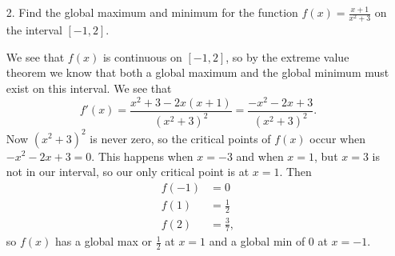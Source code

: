 \documentclass[11pt]{article}
\begin{document}
\newsavebox{\quizback}
\begin{lrbox}{\quizback}
\begin{minipage}[top][4.5in][t]{\textwidth} \setlength{\parindent}{1.5em}
\begin{enumerate}
\item[2.] Find the global maximum and minimum for the function
  $f(x)=\frac{x+1}{x^2+3}$ on the interval $[-1,2]$.


  \vfill
  {\color{blue}

    We see that $f(x)$ is continuous on $[-1,2]$, so by the extreme
    value theorem we know that both a global maximum and the global
    minimum must exist on this interval.  We see that
    \[
    f'(x)=\frac{x^2+3-2x(x+1)}{(x^2+3)^2} = \frac{-x^2-2x+3}{(x^2+3)^2}.
    \]
    Now $(x^2+3)^2$ is never zero, so the critical points of $f(x)$
    occur when $-x^2-2x+3=0$. This happens when $x=-3$ and when $x=1$,
    but $x=3$ is not in our interval, so our only critical point is at
    $x=1$.  Then
    \begin{align*}
      f(-1) &= 0\\
      f(1) &= \frac{1}{2}\\
      f(2) &= \frac{3}{7},
    \end{align*}
    so $f(x)$ has a global max or $\frac{1}{2}$ at $x=1$ and a global
    min of $0$ at $x=-1$.

  }

\vfill

\end{enumerate}
\end{minipage}
\end{lrbox}

\noindent \usebox{\quizfront}
\vfill
\noindent \usebox{\quizback}

\end{document}
